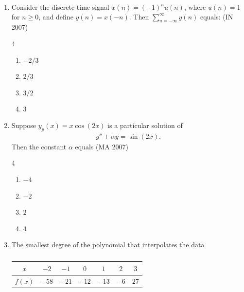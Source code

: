 \begin{enumerate}[label=\thesubsection.\arabic*,ref=\thesubsection.\theenumi]
\hfill(IN 2007)
\begin{multicols}{2}
\begin{enumerate}
\item $x_{n+1} = \dfrac{1}{2} \left(x_n + \dfrac{2}{x_n}\right)$  
\item $x_{n+1} = \dfrac{1}{2} \left(x_n - \dfrac{2}{x_n}\right)$  
\item $x_{n+1} = \dfrac{2}{x_n}$  
\item $x_{n+1} = \sqrt{2}\,x_n$  
\end{enumerate}
\end{multicols}
\item Consider the discrete-time signal $x(n) = (-1)^n u(n)$, where $u(n) = 1$ for $n \geq 0$, and define $y(n) = x(-n)$. Then $\sum_{n=-\infty}^{\infty} y(n)$ equals:
\hfill(IN 2007)
\begin{multicols}{4}
\begin{enumerate}
    \item $-2/3$
    \item $2/3$
    \item $3/2$
    \item $3$
\end{enumerate}
\end{multicols}
\item Suppose $y_p(x) = x \cos(2x)$ is a particular solution of 
\begin{align*}
y'' + \alpha y = \sin(2x).
\end{align*}
Then the constant $\alpha$ equals \hfill (MA 2007)
\begin{multicols}{4}
\begin{enumerate}
    \item $-4$
    \item $-2$
    \item $2$
    \item $4$
\end{enumerate}
\end{multicols}
\item The smallest degree of the polynomial that interpolates the data

\begin{table}[ht]
\centering
\begin{tabular}{|c|c|c|c|c|c|c|}
\hline      
$x$     & $-2$ & $-1$ & $0$ & $1$ & $2$ & $3$ \\
\hline
$f(x)$  & $-58$ & $-21$ & $-12$ & $-13$ & $-6$ & $27$ \\
\hline

\end{tabular}
\caption{}
\label{tab:Q51}
\end{table}



\end{enumerate}
